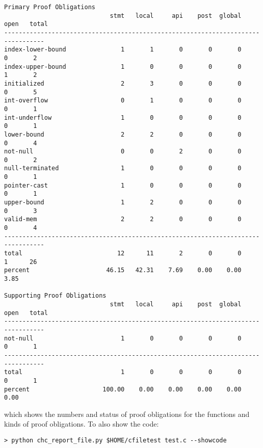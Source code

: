\documentclass[11pt]{article}
\begin{document}
\begin{small}
\begin{verbatim}
Primary Proof Obligations
                             stmt   local     api    post  global    open   total
---------------------------------------------------------------------------------
index-lower-bound               1       1       0       0       0       0       2
index-upper-bound               1       0       0       0       0       1       2
initialized                     2       3       0       0       0       0       5
int-overflow                    0       1       0       0       0       0       1
int-underflow                   1       0       0       0       0       0       1
lower-bound                     2       2       0       0       0       0       4
not-null                        0       0       2       0       0       0       2
null-terminated                 1       0       0       0       0       0       1
pointer-cast                    1       0       0       0       0       0       1
upper-bound                     1       2       0       0       0       0       3
valid-mem                       2       2       0       0       0       0       4
---------------------------------------------------------------------------------
total                          12      11       2       0       0       1      26
percent                     46.15   42.31    7.69    0.00    0.00    3.85

Supporting Proof Obligations
                             stmt   local     api    post  global    open   total
---------------------------------------------------------------------------------
not-null                        1       0       0       0       0       0       1
---------------------------------------------------------------------------------
total                           1       0       0       0       0       0       1
percent                    100.00    0.00    0.00    0.00    0.00    0.00

\end{verbatim}
\end{small}
which shows the numbers and status of proof obligations for the functions and kinds
of proof obligations. To also show the code:

\begin{verbatim}
> python chc_report_file.py $HOME/cfiletest test.c --showcode
\end{verbatim}
\end{document}
